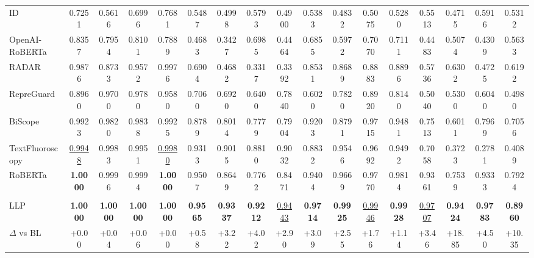 \begin{tabular}{lcccccccccccccccc}
ID & 0.7251 & 0.5616 & 0.6996 & 0.7681 & 0.5487 & 0.4998 & 0.5793 & 0.4900 & 0.5383 & 0.4832 & 0.5075 & 0.5280 & 0.5513 & 0.4715 & 0.5916 & 0.5312 \\
OpenAI-RoBERTa & 0.8357 & 0.7954 & 0.8101 & 0.7889 & 0.4683 & 0.3427 & 0.6985 & 0.4464 & 0.6855 & 0.5972 & 0.7070 & 0.7111 & 0.4483 & 0.5074 & 0.4309 & 0.5633 \\
RADAR & 0.9876 & 0.8733 & 0.9572 & 0.9976 & 0.6904 & 0.4682 & 0.3317 & 0.3392 & 0.8531 & 0.8689 & 0.8883 & 0.8896 & 0.5736 & 0.6302 & 0.4725 & 0.6192 \\
RepreGuard & 0.8960 & 0.9700 & 0.9780 & 0.9580 & 0.7060 & 0.6920 & 0.6400 & 0.7840 & 0.6020 & 0.7820 & 0.8920 & 0.8140 & 0.5040 & 0.5300 & 0.6040 & 0.4980 \\
BiScope & 0.9923 & 0.9820 & 0.9838 & 0.9925 & 0.8789 & 0.8014 & 0.7779 & 0.7904 & 0.9203 & 0.8791 & 0.9715 & 0.9481 & 0.7513 & 0.6011 & 0.7969 & 0.7056 \\
TextFluoroscopy & \cellcolor{orange!25}\underline{0.9948} & 0.9983 & 0.9951 & \cellcolor{orange!25}\underline{0.9980} & 0.9313 & 0.9015 & 0.8810 & 0.9032 & 0.8832 & 0.9546 & 0.9692 & 0.9492 & 0.7058 & 0.3723 & 0.2781 & 0.4089 \\
RoBERTa & \cellcolor{cyan!25}\textbf{1.0000} & 0.9996 & 0.9994 & \cellcolor{cyan!25}\textbf{1.0000} & 0.9507 & 0.8649 & 0.7762 & 0.8471 & 0.9404 & 0.9669 & 0.9770 & 0.9814 & 0.9361 & 0.7539 & 0.9333 & 0.7924 \\
\midrule
\rowcolor{gray!15} \multicolumn{17}{c}{\textbf{Linear Probes}} \\
\midrule
LLP & \cellcolor{cyan!25}\textbf{1.0000} & \cellcolor{cyan!25}\textbf{1.0000} & \cellcolor{cyan!25}\textbf{1.0000} & \cellcolor{cyan!25}\textbf{1.0000} & \cellcolor{cyan!25}\textbf{0.9565} & \cellcolor{cyan!25}\textbf{0.9337} & \cellcolor{cyan!25}\textbf{0.9212} & \cellcolor{orange!25}\underline{0.9443} & \cellcolor{cyan!25}\textbf{0.9714} & \cellcolor{cyan!25}\textbf{0.9925} & \cellcolor{orange!25}\underline{0.9946} & \cellcolor{cyan!25}\textbf{0.9928} & \cellcolor{orange!25}\underline{0.9707} & \cellcolor{cyan!25}\textbf{0.9424} & \cellcolor{cyan!25}\textbf{0.9783} & \cellcolor{cyan!25}\textbf{0.8960} \\
\hspace*{1em}$\Delta$ vs BL & \textcolor{green!60!black}{+0.00} & \textcolor{green!60!black}{+0.04} & \textcolor{green!60!black}{+0.06} & \textcolor{green!60!black}{+0.00} & \textcolor{green!60!black}{+0.58} & \textcolor{green!60!black}{+3.22} & \textcolor{green!60!black}{+4.02} & \textcolor{green!60!black}{+2.90} & \textcolor{green!60!black}{+3.09} & \textcolor{green!60!black}{+2.55} & \textcolor{green!60!black}{+1.76} & \textcolor{green!60!black}{+1.14} & \textcolor{green!60!black}{+3.46} & \textcolor{green!60!black}{+18.85} & \textcolor{green!60!black}{+4.50} & \textcolor{green!60!black}{+10.35} \\

\end{tabular}
